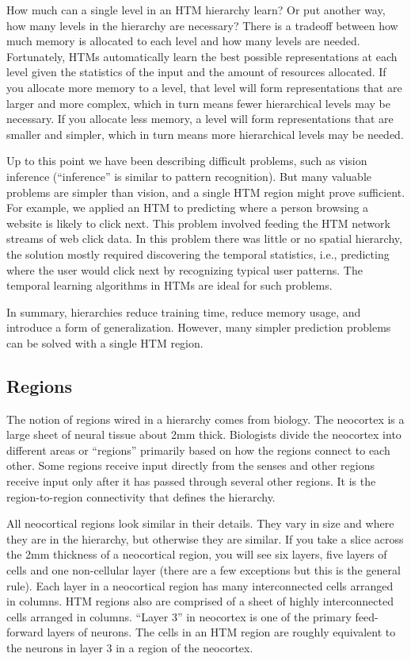 \documentclass{report}
\begin{document}
How much can a single level in an HTM hierarchy learn? Or put another
way, how many levels in the hierarchy are necessary? There is a
tradeoff between how much memory is allocated to each level and how
many levels are needed. Fortunately, HTMs automatically learn the best
possible representations at each level given the statistics of the
input and the amount of resources allocated. If you allocate more
memory to a level, that level will form representations that are
larger and more complex, which in turn means fewer hierarchical levels
may be necessary. If you allocate less memory, a level will form
representations that are smaller and simpler, which in turn means more
hierarchical levels may be needed.

Up to this point we have been describing difficult problems, such as
vision inference (``inference'' is similar to pattern
recognition). But many valuable problems are simpler than vision, and
a single HTM region might prove sufficient. For example, we applied an
HTM to predicting where a person browsing a website is likely to click
next. This problem involved feeding the HTM network streams of web
click data. In this problem there was little or no spatial hierarchy,
the solution mostly required discovering the temporal statistics,
i.e., predicting where the user would click next by recognizing typical
user patterns. The temporal learning algorithms in HTMs are ideal for
such problems.

In summary, hierarchies reduce training time, reduce memory usage, and
introduce a form of generalization. However, many simpler prediction
problems can be solved with a single HTM region.

\subsection*{Regions}

The notion of regions wired in a hierarchy comes from biology. The
neocortex is a large sheet of neural tissue about 2mm
thick. Biologists divide the neocortex into different areas or
``regions'' primarily based on how the regions connect to each
other. Some regions receive input directly from the senses and other
regions receive input only after it has passed through several other
regions. It is the region-to-region connectivity that defines the
hierarchy.

All neocortical regions look similar in their details. They vary in
size and where they are in the hierarchy, but otherwise they are
similar. If you take a slice across the 2mm thickness of a neocortical
region, you will see six layers, five layers of cells and one
non-cellular layer (there are a few exceptions but this is the general
rule). Each layer in a neocortical region has many interconnected
cells arranged in columns. HTM regions also are comprised of a sheet
of highly interconnected cells arranged in columns. ``Layer 3'' in
neocortex is one of the primary feed-forward layers of neurons. The
cells in an HTM region are roughly equivalent to the neurons in layer
3 in a region of the neocortex.
\end{document}
